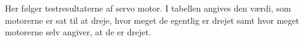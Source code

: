 \label{appendix:motor_test}
Her følger testresultaterne af \legos servo motor.
I tabellen angives den værdi, som motorerne er sat til at dreje, hvor meget de egentlig er drejet samt hvor meget motorerne selv angiver, at de er drejet.


